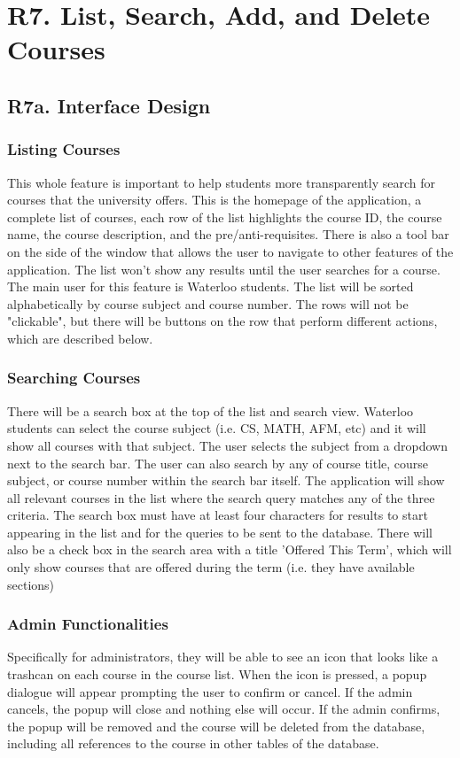 \documentclass[12pt, a4paper]{article}
\begin{document}
\section*{R7. List, Search, Add, and Delete Courses}
\label{sec:R7}
\subsection*{R7a. Interface Design}
\subsubsection*{Listing Courses}
This whole feature is important to help students more transparently search for courses that the university offers. This is the homepage of the application, a complete list of courses, each row of the list highlights the course ID, the course name, the course description, and the pre/anti-requisites. There is also a tool bar on the side of the window that allows the user to navigate to other features of the application. The list won't show any results until the user searches for a course. The main user for this feature is Waterloo students. The list will be sorted alphabetically by course subject and course number. The rows will not be "clickable", but there will be buttons on the row that perform different actions, which are described below.
\subsubsection*{Searching Courses}
There will be a search box at the top of the list and search view. Waterloo students can select the course subject (i.e. CS, MATH, AFM, etc) and it will show all courses with that subject. The user selects the subject from a dropdown next to the search bar. The user can also search by any of course title, course subject, or course number within the search bar itself. The application will show all relevant courses in the list where the search query matches any of the three criteria. The search box must have at least four characters for results to start appearing in the list and for the queries to be sent to the database. There will also be a check box in the search area with a title 'Offered This Term', which will only show courses that are offered during the term (i.e. they have available sections)
\subsubsection*{Admin Functionalities}
Specifically for administrators, they will be able to see an icon that looks like a trashcan on each course in the course list. When the icon is pressed, a popup dialogue will appear prompting the user to confirm or cancel. If the admin cancels, the popup will close and nothing else will occur. If the admin confirms, the popup will be removed and the course will be deleted from the database, including all references to the course in other tables of the database.
\end{document}
